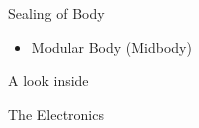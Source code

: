 \documentclass[10pt, a4paper]{beamer}
\begin{document}
\begin{frame}{Sealing of Body}
	\begin{itemize}
    \item Modular Body (Midbody)
    \end{itemize}
\end{frame}

\begin{frame}{A look inside}

\centering
{}
\end{frame}

\begin{frame}{The Electronics}
\centering
{}	
\end{frame}
\end{document}
